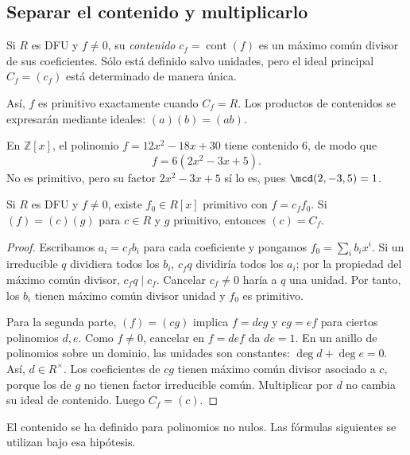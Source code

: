 \subsection{Separar el contenido y multiplicarlo}
\begin{defi}
Si $R$ es DFU y $f\ne0$, su \emph{contenido} $c_f=\operatorname{cont}(f)$ es un máximo común divisor de sus coeficientes. Sólo está definido salvo unidades, pero el ideal principal $C_f=(c_f)$ está determinado de manera única.
\end{defi}
Así, $f$ es primitivo exactamente cuando $C_f=R$. Los productos de contenidos se expresarán mediante ideales: $(a)(b)=(ab)$.

\begin{ejem}
En $\mathbb Z[x]$, el polinomio $f=12x^2-18x+30$ tiene contenido $6$, de modo que
\[
f=6(2x^2-3x+5).
\]
No es primitivo, pero su factor $2x^2-3x+5$ sí lo es, pues $\mcd(2,-3,5)=1$.
\end{ejem}

\begin{lema}\label{lema:C17-parte-primitiva}
Si $R$ es DFU y $f\ne0$, existe $f_0\in R[x]$ primitivo con $f=c_ff_0$. Si $(f)=(c)(g)$ para $c\in R$ y $g$ primitivo, entonces $(c)=C_f$.
\end{lema}
\begin{proof}
Escribamos $a_i=c_fb_i$ para cada coeficiente y pongamos $f_0=\sum_i b_ix^i$. Si un irreducible $q$ dividiera todos los $b_i$, $c_fq$ dividiría todos los $a_i$; por la propiedad del máximo común divisor, $c_fq\mid c_f$. Cancelar $c_f\ne0$ haría a $q$ una unidad. Por tanto, los $b_i$ tienen máximo común divisor unidad y $f_0$ es primitivo.

Para la segunda parte, $(f)=(cg)$ implica $f=dcg$ y $cg=ef$ para ciertos polinomios $d,e$. Como $f\ne0$, cancelar en $f=def$ da $de=1$. En un anillo de polinomios sobre un dominio, las unidades son constantes: $\deg d+\deg e=0$. Así, $d\in R^\times$. Los coeficientes de $cg$ tienen máximo común divisor asociado a $c$, porque los de $g$ no tienen factor irreducible común. Multiplicar por $d$ no cambia su ideal de contenido. Luego $C_f=(c)$.
\end{proof}
\begin{obs}
El contenido se ha definido para polinomios no nulos. Las fórmulas siguientes se utilizan bajo esa hipótesis.
\end{obs}

